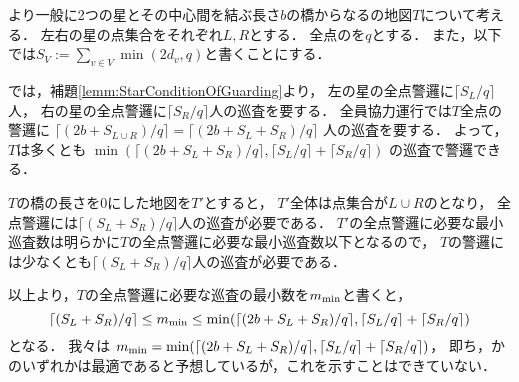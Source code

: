 より一般に2つの星とその中心間を結ぶ長さ$b$の橋からなる{\graphTree}の地図$T$について考える．
左右の星の点集合をそれぞれ$L, R$とする．
全点の{\maxIdletime}を$q$とする．
また，以下では$S_V := \sum_{v \in V} \min(2d_v, q)$と書くことにする．
\newcommand{\lrceil}[1]{\lceil{#1}\rceil}

{\separatedPatroll}では，補題\ref{lemm:StarConditionOfGuarding}より，
左の星の全点警邏に$\lrceil{S_L / q}$人，
右の星の全点警邏に$\lrceil{S_R / q}$人の巡査を要する．
全員協力運行では$T$全点の警邏に
$\lrceil{( 2b + S_{L \cup R} ) / q}
 = \lrceil{( 2b + S_L + S_R ) / q}$%
人の巡査を要する．
よって，$T$は多くとも
$\min(
  \lrceil{( 2b + S_L + S_R ) / q},
  \lrceil{S_L / q} + \lrceil{S_R / q} )$%
の巡査で警邏できる．

$T$の橋の長さを$0$にした地図を$T'$とすると，
$T'$全体は点集合が$L \cup R$の{\graphStar}となり，
全点警邏には$\lrceil{(S_L + S_R) / q}$人の巡査が必要である．
$T'$の全点警邏に必要な最小巡査数は明らかに$T$の全点警邏に必要な最小巡査数以下となるので，
$T$の警邏には少なくとも$\lrceil{(S_L + S_R) / q}$人の巡査が必要である．

以上より，$T$の全点警邏に必要な巡査の最小数を$m_{\rm min}$と書くと，
\[
  \lrceil{(S_L + S_R) / q}
    \leq m_{\rm min}
    \leq \min(
        \lrceil{( 2b + S_L + S_R ) / q},
        \lrceil{S_L / q} + \lrceil{S_R / q} )
\]
となる．
我々は
$m_{\rm min} = \min(
        \lrceil{( 2b + S_L + S_R ) / q},
        \lrceil{S_L / q} + \lrceil{S_R / q} )$，
即ち，{\separatedPatroll}か{\cooperativePatroll}のいずれかは最適であると予想しているが，これを示すことはできていない．


